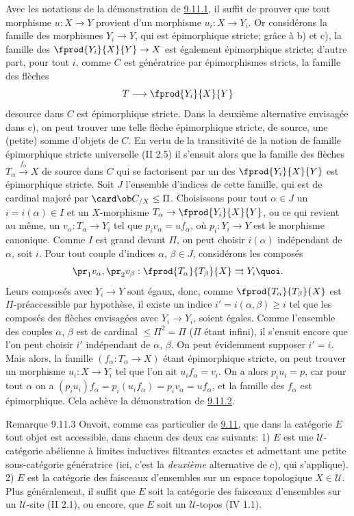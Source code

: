 Avec les notations de la démonstration de \hyperref[I.lem9.11.1]{9.11.1}, il suffit de
prouver que tout morphisme $u:X\rightarrow Y$ provient d'un
morphisme $u_i:X\rightarrow Y_i$. Or considérons la famille des
morphismes $Y_i\rightarrow Y$, qui est épimorphique stricte; grâce à
b) et c), la famille des $\fprod{Y_i}{X}{Y} \rightarrow X$ est
également épimorphique stricte; d'autre part, pour tout $i$, comme
$C$ est génératrice par épimorphismes stricts, la famille des
flèches
$$
T\longrightarrow \fprod{Y_i}{X}{Y}
$$
de\pageoriginale source dans $C$ est épimorphique stricte. Dans la
deuxième alternative envisagée dans c), on peut trouver une telle
flèche épimorphique stricte, de source, une (petite) somme d'objets
de $C$. En vertu de la transitivité de la notion de famille
épimorphique stricte universelle (II 2.5) il s'ensuit alors que la
famille des flèches $T_\alpha\xrightarrow{f_\alpha}X$ de source dans
$C$ qui se factorisent par un des $\fprod{Y_i}{X}{Y}$ est
épimorphique stricte. Soit $J$ l'ensemble d'indices de cette
famille, qui est de cardinal majoré par $\card \ob C_{/X}\leq \Pi$.
Choisissons pour tout $\alpha\in J$ un $i=i(\alpha)\in I$ et un
$X$-morphisme $T_\alpha\rightarrow \fprod{Y_i}{X}{Y}$, ou ce qui
revient au même, un $v_\alpha:T_\alpha\rightarrow Y_i$ tel que
$p_iv_\alpha=uf_\alpha$, où $p_i:Y_i\rightarrow Y$ est le morphisme
canonique. Comme $I$ est grand devant $\Pi$, on peut choisir
$i(\alpha)$ indépendant de $\alpha$, soit $i$. Pour tout couple
d'indices $\alpha$, $\beta\in J$, considérons les composés
$$
\pr_1 v_\alpha, \pr_2
v_\beta:\fprod{T_\alpha}{T_\beta}{X}\rightrightarrows Y_i{\quoi}.
$$
Leurs composés avec $Y_i\rightarrow Y$ sont égaux, donc, comme
$\fprod{T_\alpha}{T_\beta}{X}$ est $\Pi$-préaccessible par
hypothèse, il existe un indice $i'=i(\alpha,\beta)\geq i$ tel que
les composés des flèches envisagées avec $Y_i\rightarrow Y_i$,
soient égales. Comme l'ensemble des couples $\alpha$, $\beta$ est de
cardinal $\leq \Pi^2=\Pi$ ($\Pi$ étant infini), il s'ensuit encore
que l'on peut choisir $i'$ indépendant de $\alpha$, $\beta$. On peut
évidemment supposer $i'=i$. Mais alors, la famille
$(f_\alpha:T_\alpha\rightarrow X)$ étant épimorphique stricte, on
peut trouver un morphisme $u_i:X\rightarrow Y_i$ tel que l'on ait
$u_if_\alpha=v_i$. On a alors $p_iu_i=p$, car pour tout $\alpha$ on
a $(p_iu_i)f_\alpha=p_i(u_if_\alpha)=p_iv_\alpha=uf_\alpha$, et la
famille des $f_\alpha$ est épimorphique. Cela achève la
démonstration de \hyperref[I.lem9.11.2]{9.11.2}.

\begin{enonce*}[remark]{Remarque 9.11.3}
On\pageoriginale voit, comme cas particulier de \hyperref[I.prop9.11]{9.11},
que dans la catégorie $E$ tout objet est accessible, dans chacun des
deux cas suivants: 1) $E$ est une $𝒰$-catégorie abélienne à
limites inductives filtrantes exactes et admettant une petite
sous-catégorie génératrice (ici, c'est la \emph{deuxième}
alternative de c), qui s'applique). 2) $E$ est la catégorie des
faisceaux d'ensembles sur un espace topologique $X\in 𝒰$.
Plus généralement, il suffit que $E$ soit la catégorie des faisceaux
d'ensembles sur un $𝒰$-site (II 2.1), ou encore, que $E$
soit un $𝒰$-topos (IV 1.1).
\end{enonce*}

